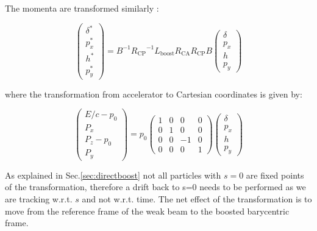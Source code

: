 The momenta are transformed similarly \cite{beam_beam}:

\begin{equation}
\left( \begin{matrix}
\delta^*\\
p_x^*\\
h^*\\
p_y^*
\end{matrix} \right) = 
B^{-1}{R_{\mathrm{CP}}}^{-1}L_{\mathrm{boost}}R_{\mathrm{CA}}R_{\mathrm{CP}}B
\left( \begin{matrix}
\delta\\
p_x\\
h\\
p_y
\end{matrix} \right) 
\end{equation}

where the transformation from accelerator to Cartesian coordinates is given by:

\begin{equation}
\left( \begin{matrix}
E/c-p_0\\
P_x\\
P_z-p_0\\
P_y
\end{matrix} \right) = p_0
\left( \begin{matrix}
1 &0 &0&0\\
0 &1&0 &0\\
0 &0&-1 &0\\
0 &0 &0&1
\end{matrix} \right)
\left( \begin{matrix}
\delta\\
p_x\\
h\\
p_y
\end{matrix} \right) 
\end{equation}

As explained in Sec.\ref{sec:directboost} not all particles with $s=0$ are fixed points of the transformation, therefore a drift  back to s=0 needs to be performed as we are tracking w.r.t. $s$ and not w.r.t. time. The net effect of the transformation is to move from the reference frame of the weak beam to the boosted barycentric frame.


